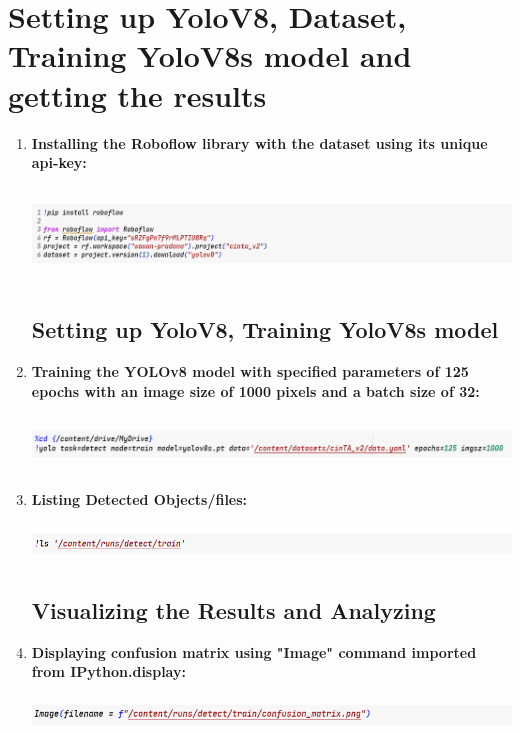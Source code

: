 \documentclass[12 pt]{report}
\begin{document}
\section{Setting up YoloV8, Dataset, Training YoloV8s model and getting the results}
{
  \begin{enumerate}
    \item \textbf{Installing the Roboflow library with the dataset using its unique api-key:}
    \begin{center}
        \includegraphics[width=17cm, height=2.5cm]{Pip insall roboflow.png}
    \end{center}
\subsection{Setting up YoloV8, Training YoloV8s model}
    \item \textbf{Training the YOLOv8 model with specified parameters of 125 epochs with an image size of 1000 pixels and a batch size of 32:} 
    \begin{center}
        \includegraphics[width=17cm, height=1.5cm]{Training Yolov8model.png}
    \end{center}
    \item \textbf{Listing Detected Objects/files:}
    \begin{center}
        \includegraphics[width=17cm, height=1cm]{Listing out the files created after trining .png}
    \end{center}

    \vspace{1.34cm}
  \subsection{Visualizing the Results and Analyzing}
    \item \textbf{Displaying confusion matrix using "Image" command imported from IPython.display:}
    \begin{center}
        \includegraphics[width=17cm, height=1cm]{displaying the confusion matrix in environment.png}
    \end{center}


\end{enumerate}}
\end{document}
